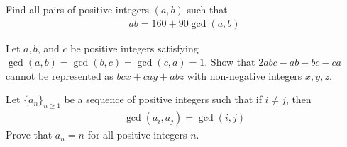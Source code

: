 \begin{problem}
	Find all pairs of positive integers $(a, b)$ such that
		\begin{align*}
			ab=160 + 90 \gcd(a,b)
		\end{align*}
\end{problem}


\begin{problem}
	Let $a, b$, and $c$ be positive integers satisfying $\gcd (a, b) = \gcd (b, c) = \gcd (c, a) = 1$. Show that $2abc-ab-bc-ca$ cannot be represented as $bcx+cay +abz$ with non-negative integers $x, y, z$. %
\end{problem}


\begin{problem}
	Let $\{a_n\}_{n\geq 1}$ be a sequence of positive integers such that if $i \neq j$, then
		\begin{align*}
			\gcd(a_i,a_j)=\gcd(i,j)
		\end{align*}
	Prove that $a_n=n$ for all positive integers $n$. %
\end{problem}


